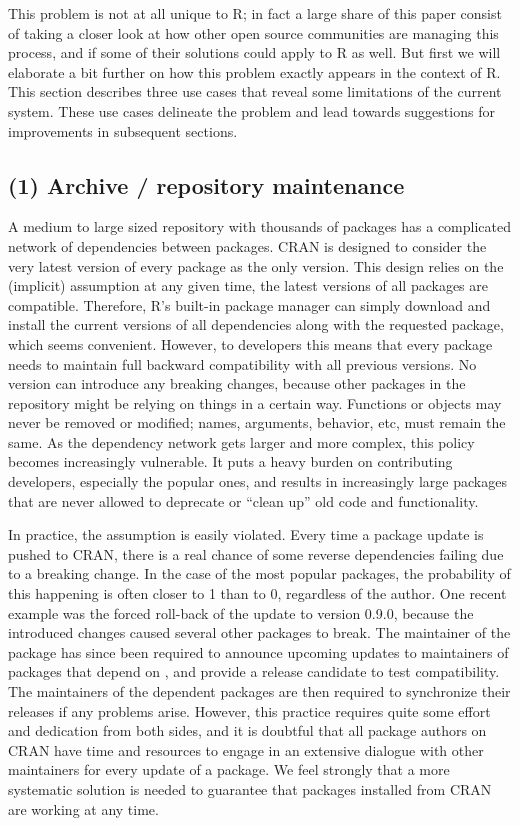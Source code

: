 This problem is not at all unique to R; in fact a large share of this paper
consist of taking a closer look at how other open source communities are
managing this process, and if some of their solutions could apply to R as
well. But first we will elaborate a bit further on how this problem exactly
appears in the context of R. This section describes three use cases that
reveal some limitations of the current system. These use cases delineate
the problem and lead towards suggestions for improvements in subsequent sections.

\subsection{(1) Archive / repository maintenance}

A medium to large sized repository with thousands of packages has a complicated
network of dependencies between packages. CRAN is designed to consider the very
latest version of every package as the only  version. This design
relies on the (implicit) assumption at any given time, the latest versions of all
packages are compatible. Therefore, R's built-in package manager can simply
download and install the current versions of all dependencies along with the
requested package, which seems convenient. However, to developers this means
that every package   needs to maintain full backward compatibility
with all previous versions. No version can introduce any breaking changes, because
other packages in the repository might be relying on things in a certain way.
Functions or objects may never be removed or modified; names, arguments, behavior,
etc, must remain the same. As the dependency network gets larger and more complex,
this policy becomes increasingly vulnerable. It puts a heavy burden on
contributing developers, especially the popular ones, and results in
increasingly large packages that are never allowed to deprecate or ``clean up''
old code and functionality.

In practice, the assumption is easily violated. Every time a package update is
pushed to CRAN, there is a real chance of some reverse dependencies failing due
to a breaking change. In the case of the most popular packages, the probability of
this happening is often closer to 1 than to 0, regardless of the author. One
recent example was the forced roll-back of the  update to version 0.9.0,
because the introduced changes caused several other packages to break. The maintainer of the
 package has since been required to announce upcoming updates to
maintainers of packages that depend on , and provide a release
candidate to test compatibility. The maintainers of the dependent packages are
then required to synchronize their releases if any problems arise. However,
this practice requires quite some effort and dedication from both sides, and it
is doubtful that all package authors on CRAN have time and resources
to engage in an extensive dialogue with other maintainers for every update of a
package. We feel strongly that a more systematic solution is needed to guarantee
that packages installed from CRAN are working at any time.

